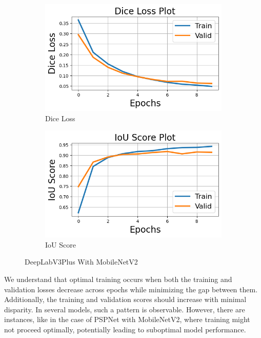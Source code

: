 \documentclass[12pt]{article}
\begin{document}
\begin{figure}[H]
  \begin{subfigure}[b]{0.5\textwidth}
    \includegraphics[width=\textwidth]{Figs/deepwithmbnetdice.png}
    \caption{Dice Loss}
    \label{fig:f1}
  \end{subfigure}
  \hfill
  \begin{subfigure}[b]{0.5\textwidth}
    \includegraphics[width=\textwidth]{Figs/deepwithmbnetiou.png}
    \caption{IoU Score}
    \label{fig:f2}
  \end{subfigure}
  \caption{DeepLabV3Plus With MobileNetV2}
\end{figure}

We understand that optimal training occurs when both the training and validation losses decrease across epochs while minimizing the gap between them. Additionally, the training and validation scores should increase with minimal disparity. In several models, such a pattern is observable. However, there are instances, like in the case of PSPNet with MobileNetV2, where training might not proceed optimally, potentially leading to suboptimal model performance.
\end{document}
